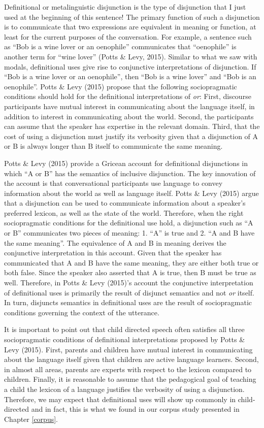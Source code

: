 \documentclass[oneside]{report}
\theoremstyle{definition}
\theoremstyle{definition}
\theoremstyle{definition}
\theoremstyle{remark}
\begin{document}
Definitional or metalinguistic disjunction is the type of disjunction
that I just used at the beginning of this sentence! The primary function
of such a disjunction is to communicate that two expressions are
equivalent in meaning or function, at least for the current purposes of
the conversation. For example, a sentence such as ``Bob is a wine lover
or an oenophile'' communicates that ``oenophile'' is another term for
``wine lover'' (Potts \& Levy, 2015). Similar to what we saw with
modals, definitional uses give rise to conjunctive interpretations of
disjunction. If ``Bob is a wine lover or an oenophile'', then ``Bob is a
wine lover'' and ``Bob is an oenophile''. Potts \& Levy (2015) propose
that the following sociopragmatic conditions should hold for the
definitional interpretations of \emph{or}: First, discourse participants
have mutual interest in communicating about the language itself, in
addition to interest in communicating about the world. Second, the
participants can assume that the speaker has expertise in the relevant
domain. Third, that the cost of using a disjunction must justify its
verbosity given that a disjunction of A or B is always longer than B
itself to communicate the same meaning.

Potts \& Levy (2015) provide a Gricean account for definitional
disjunctions in which ``A or B'' has the semantics of inclusive
disjunction. The key innovation of the account is that conversational
participants use language to convey information about the world as well
as language itself. Potts \& Levy (2015) argue that a disjunction can be
used to communicate information about a speaker's preferred lexicon, as
well as the state of the world. Therefore, when the right sociopragmatic
conditions for the definitional use hold, a disjunction such as ``A or
B'' communicates two pieces of meaning: 1. ``A'' is true and 2. ``A and
B have the same meaning''. The equivalence of A and B in meaning derives
the conjunctive interpretation in this account. Given that the speaker
has communicated that A and B have the same meaning, they are either
both true or both false. Since the speaker also asserted that A is true,
then B must be true as well. Therefore, in Potts \& Levy (2015)'s
account the conjunctive interpretation of definitional uses is primarily
the result of disjunct semantics and not \emph{or} itself. In turn,
disjuncts semantics in definitional uses are the result of
sociopragmatic conditions governing the context of the utterance.

It is important to point out that child directed speech often satisfies
all three sociopragmatic conditions of definitional interpretations
proposed by Potts \& Levy (2015). First, parents and children have
mutual interest in communicating about the language itself given that
children are active language learners. Second, in almost all areas,
parents are experts with respect to the lexicon compared to children.
Finally, it is reasonable to assume that the pedagogical goal of
teaching a child the lexicon of a language justifies the verbosity of
using a disjunction. Therefore, we may expect that definitional uses
will show up commonly in child-directed and in fact, this is what we
found in our corpus study presented in Chapter \ref{corpus}.
\end{document}
